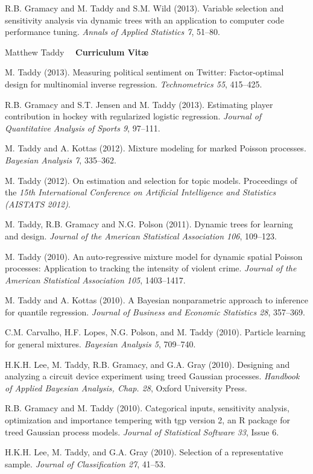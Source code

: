 \documentclass[margin,line]{res}
\begin{document}
\begin{resume}
R.B. Gramacy and M. Taddy and S.M. Wild (2013).  Variable selection and
sensitivity analysis via dynamic trees with an application to computer
code performance tuning.  {\it Annals of Applied
  Statistics 7}, 51--80.

\pagebreak
\hfill Matthew Taddy ~~{\bf Curriculum Vit\ae}


M. Taddy (2013).  Measuring political sentiment on Twitter: Factor-optimal
design for multinomial inverse regression. {\it
  Technometrics 55}, 415--425.


R.B. Gramacy and S.T. Jensen and M. Taddy (2013).  Estimating player contribution in 
hockey with regularized logistic regression. {\it Journal of Quantitative Analysis of Sports 9}, 97--111.

M.  Taddy and A. Kottas (2012). Mixture modeling for marked Poisson processes.
{\it Bayesian Analysis 7}, 335--362.


M. Taddy (2012). On estimation and selection for topic models. Proceedings of the {\it 15th International Conference on
  Artificial Intelligence and Statistics (AISTATS 2012)}.


M. Taddy, R.B. Gramacy and N.G. Polson (2011). Dynamic trees for learning and design.
 {\it Journal of the American Statistical
  Association 106}, 109--123.

M. Taddy (2010). An auto-regressive mixture model for dynamic spatial
Poisson processes: Application to tracking the intensity of violent
crime.  {\it Journal of the American Statistical
  Association 105}, 1403--1417.

M.  Taddy and A. Kottas (2010). A Bayesian nonparametric approach to inference for quantile regression.
{\it Journal of Business and Economic Statistics 28}, 357--369.

C.M. Carvalho, H.F. Lopes, N.G. Polson, and M. Taddy
(2010). Particle learning for general mixtures.  {\it Bayesian
  Analysis 5}, 709--740.

H.K.H. Lee, M. Taddy, R.B. Gramacy, and G.A. Gray
(2010). Designing and analyzing a circuit device experiment using
treed Gaussian processes.  {\it Handbook of Applied
  Bayesian Analysis, Chap. 28}, Oxford University Press.

R.B. Gramacy and M. Taddy (2010). Categorical inputs, sensitivity
       analysis, optimization and importance tempering with tgp version 2, an
       R package for treed Gaussian process models. {\it Journal of Statistical Software 33}, Issue 6.


H.K.H. Lee, M. Taddy, and G.A. Gray (2010). Selection of a representative sample.
{\it Journal of Classification 27}, 41--53.


\end{resume}
\end{document}
